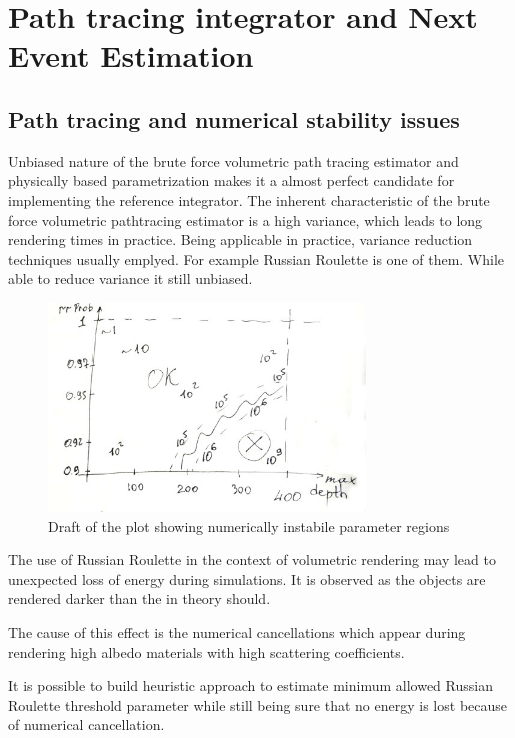 \chapter{Path tracing integrator and Next Event Estimation}
\label{chapter:ptdl}

\section{Path tracing and numerical stability issues}
\label{section:numerical}

Unbiased nature of the brute force volumetric path tracing estimator and
physically based parametrization makes it a almost perfect candidate for
implementing the reference integrator.
The inherent characteristic of the brute force volumetric pathtracing estimator
is a high variance, which leads to long rendering times in practice. Being
applicable in practice, variance reduction techniques usually emplyed. For
example Russian Roulette is one of them. While able to reduce variance it still
unbiased.

\begin{figure}[h]
    \centering
    \includegraphics[width=0.75\textwidth]{imgs/plots/rr_heuristic_draft}
    \caption{Draft of the plot showing numerically instabile parameter regions}
    \label{fig:rr_regions}
\end{figure}

The use of Russian Roulette in the context of volumetric rendering may lead to
unexpected loss of energy during simulations. It is observed as the objects are
rendered darker than the in theory should.

The cause of this effect is the numerical cancellations which appear during
rendering high albedo materials with high scattering coefficients. 

It is possible to build heuristic approach to estimate minimum allowed Russian
Roulette threshold parameter while still being sure that no energy is lost
because of numerical cancellation.

